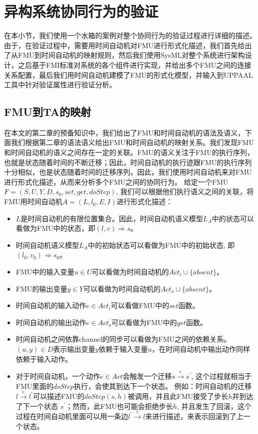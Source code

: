 \section{异构系统协同行为的验证}
在本小节，我们使用一个水箱的案例对整个协同行为的验证过程进行详细的描述。由于，在验证过程中，需要用时间自动机对FMU进行形式化描述，我们首先给出了从FMU到时间自动机的映射规则，然后我们使用SysML对整个系统进行架构设计，之后基于FMI标准对系统的各个组件进行实现，并给出多个FMU之间的连接关系配置，最后我们用时间自动机建模了FMU的形式化模型，并输入到UPPAAL工具中针对验证属性进行验证分析。
\subsection{FMU到TA的映射} 
\label{sec:encode}
在本文的第二章的预备知识中，我们给出了FMU和时间自动机的语法及语义，下面我们根据第二章的语法语义给出FMU和时间自动机的映射关系。我们发现FMU和时间自动机的语义之间存在一定的关联。FMU的语义关注于FMU的执行序列，也就是状态随着时间的不断迁移；因此，时间自动机的执行迹跟FMU的执行序列十分相似，也是状态随着时间的迁移序列。因此，我们使用时间自动机来对FMU进行形式化描述，从而来分析多个FMU之间的协同行为。
给定一个FMU$F=(S,U,Y,D,s_{0},set,get,doStep)$, 我们可以根据他们执行语义之间的关联，将FMU用时间自动机$\textit{A}=(L,l_{0},E,I)$进行形式化描述：
\begin{itemize}
\item
$L$是时间自动机的有限位置集合。因此，时间自动机语义模型$L_{\textit{A}}$中的状态可以看做为FMU中的状态，即$(l,v) \Rightarrow s$。
\item
时间自动机语义模型$L_{\textit{A}}$中的初始状态可以看做为FMU中的初始状态, 即$(l_{0},v_{0}) \Rightarrow s_{0}$。
\item
FMU中的输入变量$u \in U$可以看做为时间自动机的$Act_{i} \cup \{absent\}$。
\item
FMU的输出变量$y \in Y$可以看做为时间自动机的$Act_{o} \cup \{absent\}$。
\item
时间自动机的输入动作$e \in Act_{i}$可以看做FMU中的$set$函数。
\item
时间自动机的输出动作$e \in Act_{o}$可以看做为FMU中的$get$函数。  
\item
时间自动机之间依靠channel的同步可以看做为FMU之间的依赖关系。 $(u,y) \in D$表示输出变量$y$依赖于输入变量$u$，在时间自动机中输出动作同样依赖于输入动作。
\item
对于时间自动机，一个动作$e \in Act$会触发一个迁移$s \xrightarrow{e} s^{\prime}$, 这个过程就相当于FMU里面的$doStep$执行，会使其到达下一个状态。 例如：时间自动机的迁移$l \xrightarrow{e} l^{\prime}$可以描述FMU的$doStep(s,h)$被调用，并且此FMU接受了步长$h$并到达了下一个状态 $s^{\prime}$；然而，此FMU也可能会拒绝步长$h$, 并且发生了回滚，这个过程在时间自动机里面可以用一条边$l^{\prime} \xrightarrow{e} l$来进行描述，来表示回滚到了上一个状态。

\end{itemize}
